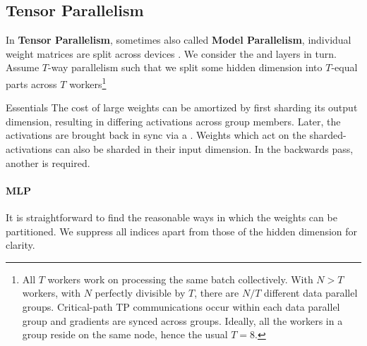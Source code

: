 \documentclass[11pt]{article}
\begin{document}
\subsection{Tensor Parallelism \label{subsec_tensor_parallelism} }


In \textbf{Tensor Parallelism}, sometimes also called \textbf{Model Parallelism}, individual weight
matrices are split across devices \cite{shoeybi2020megatronlm}. We consider the  and
 layers in turn. Assume $ T $-way parallelism such that we split some
hidden dimension into $ T $-equal parts across $ T $ workers\footnote{All $ T $ workers work on
    processing the same batch collectively.  With $ N>T $ workers, with $ N $ perfectly divisible by
    $ T $, there are $ N/T $ different data parallel groups. Critical-path TP communications occur
    within each data parallel group and gradients are synced across groups. Ideally, all the workers
    in a group reside on the same node, hence the usual $ T=8 $.}


\begin{nicebox}{Essentials}
	The cost of large weights can be amortized by first sharding its output dimension, resulting in
	differing activations across group members. Later, the activations are brought back in sync via
	a . Weights which act on the sharded-activations can also be sharded in their
	input dimension. In the backwards pass, another  is required.
\end{nicebox}

\paragraph{MLP}
It is straightforward to find the reasonable ways in which the weights can be partitioned. We
suppress all indices apart from those of the hidden dimension for clarity.
\end{document}
